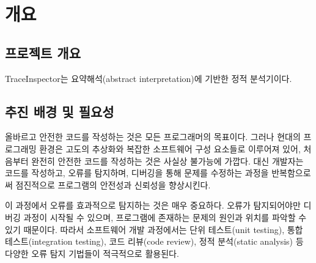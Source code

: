 \documentclass[a4paper,12pt]{article}
\begin{document}














\setcounter{page}{1}

\renewcommand{\contentsname}{목 차}
\renewcommand{\cfttoctitlefont}{\hfill\Large\bfseries}
\renewcommand{\cftaftertoctitle}{\hfill}
\renewcommand{\cftdotsep}{1}
\setcounter{secnumdepth}{4}
\setcounter{tocdepth}{5}

\tableofcontents
\clearpage

\renewcommand{\figurename}{그림}
\renewcommand{\lstlistingname}{코드}

\newtheorem*{utheorem}{정리}
\newtheorem*{udefinition}{정의}

\onehalfspacing

\section{개요}

\subsection{프로젝트 개요}

\textsf{TraceInspector}는 요약해석(abstract interpretation)에 기반한 정적 분석기이다.
\subsection{추진 배경 및 필요성}

올바르고 안전한 코드를 작성하는 것은 모든 프로그래머의 목표이다. 그러나 현대의 프로그래밍 환경은 고도의 추상화와 복잡한 소프트웨어 구성 요소들로 이루어져 있어, 
처음부터 완전히 안전한 코드를 작성하는 것은 사실상 불가능에 가깝다. 대신 개발자는 코드를 작성하고, 오류를 탐지하며, 디버깅을 통해 문제를 수정하는 과정을 
반복함으로써 점진적으로 프로그램의 안전성과 신뢰성을 향상시킨다.

이 과정에서 오류를 효과적으로 탐지하는 것은 매우 중요하다. 오류가 탐지되어야만 디버깅 과정이 시작될 수 있으며, 프로그램에 존재하는 문제의 원인과 위치를
 파악할 수 있기 때문이다. 따라서 소프트웨어 개발 과정에서는 단위 테스트(unit testing), 통합 테스트(integration testing), 코드 리뷰(code review), 
 정적 분석(static analysis) 등 다양한 오류 탐지 기법들이 적극적으로 활용된다.
\end{document}
